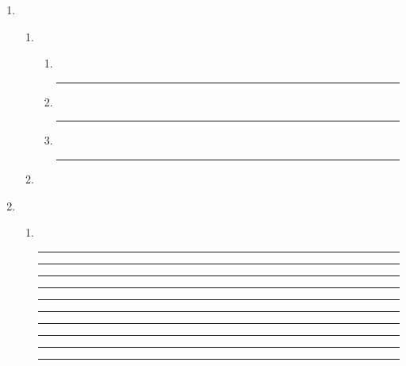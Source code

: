 \documentclass[a4paper,10pt]{article}
\begin{document}
\begin{enumerate}
\begin{enumerate}
\newpage

\item~

\vspace{7mm}\hrule\vspace{7mm}\hrule\vspace{7mm}\hrule\vspace{7mm}\hrule
\vspace{7mm}\hrule\vspace{7mm}\hrule\vspace{3mm}

\end{enumerate}

\item~
\begin{enumerate}
\item~

\begin{enumerate}
\item~
\vspace{7mm}\hrule\vspace{3mm}
\item~
\vspace{7mm}\hrule\vspace{3mm}
\item~
\vspace{7mm}\hrule\vspace{3mm}

\end{enumerate}

\item~
\begin{center}
\end{center}

\end{enumerate}

\newpage
\item~
\begin{enumerate}
\item~

\vspace{7mm}\hrule\vspace{7mm}\hrule\vspace{7mm}\hrule\vspace{7mm}\hrule
\vspace{7mm}\hrule\vspace{7mm}\hrule\vspace{7mm}\hrule\vspace{7mm}\hrule
\vspace{7mm}\hrule\vspace{7mm}\hrule\vspace{3mm}


\end{enumerate}
\end{enumerate}
\end{document}
